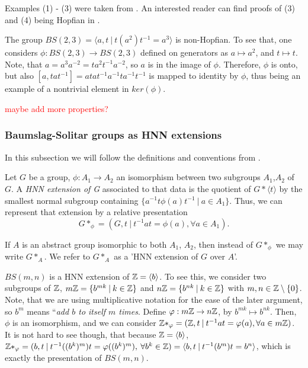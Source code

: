 Examples (1) - (3) were taken from \cite{CeSi23}. An interested reader can find proofs of (3) and (4) being Hopfian in \cite[~chapters I, IV]{LySch15}. 

\begin{importantexample}\cite[page 514]{BrHa11}
    The group $BS(2,3) = \langle a,t \: | \: t(a^2)t^{-1} = a^3\rangle $ is non-Hopfian. To see that, one considers $\phi: BS(2,3) \to BS(2,3)$ defined on generators as $a \mapsto a^2$, and $t \mapsto t$. Note, that $a = a^3a^{-2} = ta^2t^{-1}a^{-2}$, so $a$ is in the image of $\phi$. Therefore, $\phi$ is onto, but also $[a,tat^{-1}] = atat^{-1}a^{-1}ta^{-1}t^{-1}$ is mapped to identity by $\phi$, thus being an example of a nontrivial element in $ker(\phi)$.
\end{importantexample}

\textcolor{red}{maybe add more properties?}

\subsubsection{Baumslag-Solitar groups as HNN extensions}

In this subsection we will follow the definitions and conventions from \cite[pages 497-498]{BrHa11}.

\begin{definition}
\label{HNN}
    Let $G$ be a group, $\phi: A_1 \to A_2$ an isomorphism between two subgroups $A_1$,$A_2$ of $G$. A \emph{HNN extension of G} associated to that data is the quotient of $G \ast \langle t \rangle$ by the smallest normal subgroup containing $\{a^{-1}t\phi(a)t^{-1} \: | \: a \in A_1 \}$. Thus, we can represent that extension by a relative presentation 
    \[G \ast_\phi = ( G,t \: | \: t^{-1}at = \phi(a), \forall a \in A_1). \]
\end{definition}

\begin{remark}
    If $A$ is an abstract group isomorphic to both $A_1$, $A_2$, then instead of $G \ast _\phi$ we may write $G \ast _A$. We refer to $G \ast _A$ as a 'HNN extension of $G$ over $A$'.
\end{remark}

\begin{example}\label{BS as HNN}
    $BS(m,n)$ is a HNN extension of $\mathbb{Z}  =\langle b \rangle$. To see this, we consider two subgroups of $\mathbb{Z}$, $m\mathbb{Z} = \{b^{mk}\: | \: k \in \mathbb{Z}\}$ and $n\mathbb{Z} = \{b^{nk}\: | \: k \in \mathbb{Z}\}$ with $m,n \in \mathbb{Z} \setminus \{0\}$. Note, that we are using multiplicative notation for the ease of the later argument, so $b^m$ means ``\emph{add $b$ to itself $m$ times}. Define $\varphi: m\mathbb{Z} \to n\mathbb{Z}$, by $b^{mk} \mapsto b^{nk}$. Then, $\phi$ is an isomorphism, and we can consider $\mathbb{Z}\ast_\varphi = (\mathbb{Z},t \: | \: t^{-1}at = \varphi(a), \forall a\in m\mathbb{Z})$. It is not hard to see though, that because $\mathbb{Z} = \langle b \rangle$, $\mathbb{Z}\ast_\varphi = ( b,t \: | \: t^{-1}((b^k)^m)t = \varphi((b^k)^m), \: \forall b^k\in \mathbb{Z} ) = \langle b,t \: | \: t^{-1}(b^m)t = b^n\rangle $, which is exactly the presentation of $BS(m,n)$.
\end{example}

